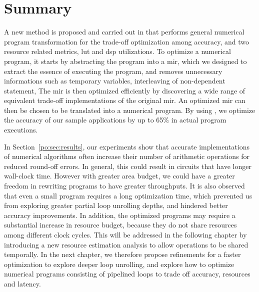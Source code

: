 \section{Summary}
\label{po:sec:conclusion}

A new method is proposed and carried out in \soap{} that performs general
numerical program transformation for the trade-off optimization among accuracy,
and two resource related metrics, \gls{lut} and \gls{dsp} utilizations.  To
optimize a numerical program, it starts by abstracting the program into a
\gls{mir}, which we designed to extract the essence of executing the program,
and removes unnecessary informations such as temporary variables, interleaving
of non-dependent statement, \etc{} The \gls{mir} is then optimized efficiently
by discovering a wide range of equivalent trade-off implementations of the
original \gls{mir}\@.  An optimized \gls{mir} can then be chosen to be
translated into a numerical program.  By using \soap, we optimize the accuracy
of our sample applications by up to 65\% in actual program executions.

In Section~\ref{po:sec:results}, our experiments show that accurate
implementations of numerical algorithms often increase their number of
arithmetic operations for reduced round-off errors.  In general, this could
result in circuits that have longer wall-clock time.  However with greater
area budget, we could have a greater freedom in rewriting programs to have
greater throughputs.  It is also observed that even a small program requires
a long optimization time, which prevented us from exploring greater partial
loop unrolling depths, and hindered better accuracy improvements.  In addition,
the optimized programs may require a substantial increase in resource budget,
because they do not share resources among different clock cycles.  This will
be addressed in the following chapter by introducing a new resource estimation
analysis to allow operations to be shared temporally.  In the next chapter,
we therefore propose refinements for a faster optimization to explore deeper
loop unrolling, and explore how to optimize numerical programs consisting of
pipelined loops to trade off accuracy, resources and latency.
